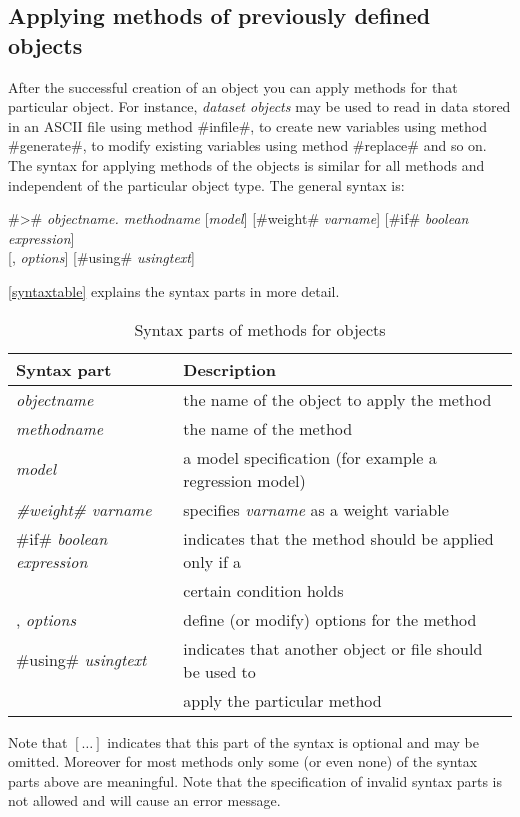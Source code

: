 \subsection{Applying methods of previously defined objects}

After the successful creation of an object you can apply methods
for that particular object. For instance, {\em dataset objects}
may be used to read in data stored in an ASCII file using method
#infile#, to create new variables using method #generate#, to modify
existing variables using method #replace# and so on. The syntax
for applying methods of the objects is similar for all methods
and independent of the particular object type. The general syntax is: \\
 

#># {\em objectname. methodname} [{\em model}] [#weight# {\em varname}] [#if# {\em boolean expression}]  \\
\hspace*{4.8cm}  [, {\em options}] [#using# {\em usingtext}]

\autoref{syntaxtable} explains the syntax parts in more detail.


\begin{table}[ht]
 \centering
\begin{tabular}{|l|l|}
\hline
Syntax part & Description \\
\hline
{\em objectname} & the name of the object to apply the method \\
{\em methodname} & the name of the method \\
{\em model} & a model specification (for example a regression model) \\
{\em #weight# varname} & specifies {\em varname} as a weight variable \\
#if# {\em boolean expression} & indicates that the method should be applied only if a \\
& certain condition holds \\
, {\em options} & define (or modify) options for the method \\
#using# {\em usingtext} & indicates that another object or file should be used to \\
& apply the particular method \\
\hline
\end{tabular}
{\em \caption{\label{syntaxtable}Syntax parts of methods for
objects}}
\end{table}


Note that $[\dots]$ indicates that this part of the syntax is
optional and may be omitted. Moreover for most methods only some
(or even none) of the syntax parts above are meaningful. Note that
the specification of invalid syntax parts is not allowed and will
cause an error message.

